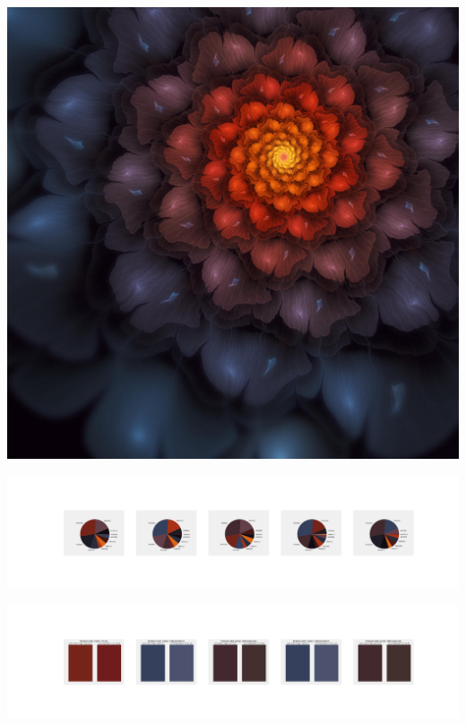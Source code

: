 \documentclass[11pt]{article}
\begin{document}
\begin{landscape}
    \begin{center}
    \includegraphics[width=\textwidth]{./nbimg/file (167).jpg}
    \end{center}

    \begin{center}
    \includegraphics[width=250mm]{./nbimg/pie-75.jpg}
    \end{center}

    \begin{center}
    \includegraphics[width=250mm]{./nbimg/peak-75.jpg}
    \end{center}
    


\end{landscape}
\end{document}
